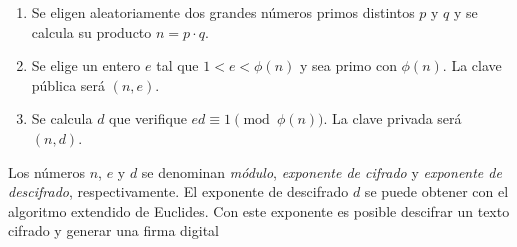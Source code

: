 \begin{enumerate}
    \item Se eligen aleatoriamente dos grandes números primos distintos $p$ y $q$ y se calcula su producto $n = p \cdot q$.
    \item Se elige un entero $e$ tal que $1 < e < \phi(n)$ y sea primo con $\phi(n)$. La clave pública será $(n, e)$.
    \item Se calcula $d$ que verifique $ed \equiv 1 \pmod{\phi(n)}$. La clave privada será $(n, d)$.
\end{enumerate}

Los números $n$, $e$ y $d$ se denominan \emph{módulo}, \emph{exponente de cifrado} y \emph{exponente de descifrado}, respectivamente. El exponente de descifrado $d$ se puede obtener con el algoritmo extendido de Euclides. Con este exponente es posible descifrar un texto cifrado y generar una firma digital

